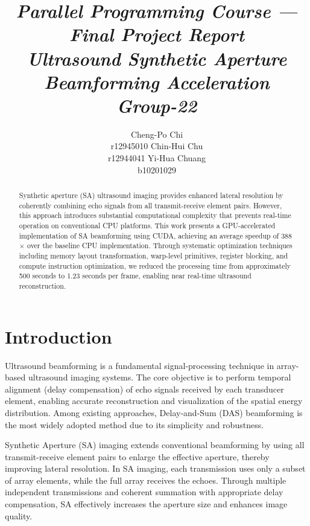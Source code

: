 \documentclass{article}
\title{
\huge \textit{Parallel Programming Course — Final Project Report} \\
\Large \textit{Ultrasound Synthetic Aperture Beamforming Acceleration}\\
\Large \textit{Group-22}
}
\author{
Cheng-Po Chi \\
r12945010
\And
Chin-Hui Chu \\
r12944041
\And
Yi-Hua Chuang \\
b10201029
}
\date{}
\begin{document}
\maketitle

\begin{abstract}
Synthetic aperture (SA) ultrasound imaging provides enhanced lateral resolution by coherently combining echo signals from all transmit-receive element pairs. However, this approach introduces substantial computational complexity that prevents real-time operation on conventional CPU platforms. This work presents a GPU-accelerated implementation of SA beamforming using CUDA, achieving an average speedup of 388$\times$ over the baseline CPU implementation. Through systematic optimization techniques including memory layout transformation, warp-level primitives, register blocking, and compute instruction optimization, we reduced the processing time from approximately 500 seconds to 1.23 seconds per frame, enabling near real-time ultrasound reconstruction.
\end{abstract}

\section{Introduction}

Ultrasound beamforming is a fundamental signal-processing technique in array-based ultrasound imaging systems. The core objective is to perform temporal alignment (delay compensation) of echo signals received by each transducer element, enabling accurate reconstruction and visualization of the spatial energy distribution. Among existing approaches, Delay-and-Sum (DAS) beamforming is the most widely adopted method due to its simplicity and robustness.

Synthetic Aperture (SA) imaging extends conventional beamforming by using all transmit-receive element pairs to enlarge the effective aperture, thereby improving lateral resolution. In SA imaging, each transmission uses only a subset of array elements, while the full array receives the echoes. Through multiple independent transmissions and coherent summation with appropriate delay compensation, SA effectively increases the aperture size and enhances image quality.
\end{document}
